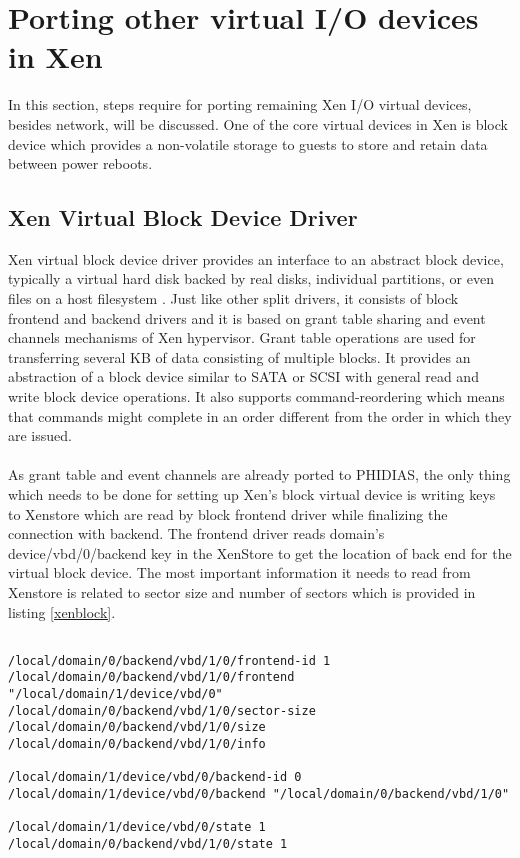 \section{Porting other virtual I/O devices in Xen \label{sec:otherio}}
In this section, steps require for porting remaining Xen I/O virtual devices, besides network, will be discussed.  One of the core virtual devices in Xen is block device which provides a non-volatile storage to guests to store and retain data between power reboots.

\subsection{Xen Virtual Block Device Driver \label{sec:block}}
Xen virtual block device driver provides an interface to an abstract block device, typically a virtual hard disk backed by real disks, individual partitions, or even files on a host filesystem \cite{xen_book}. Just like other split drivers, it consists of block frontend and backend drivers and it is based on grant table sharing and event channels mechanisms of Xen hypervisor. Grant table operations are used for transferring several KB of data consisting of multiple blocks. It provides an abstraction of a block device similar to SATA or SCSI with general read and write block device operations. It also supports command-reordering which means that commands might complete in an order different from the order in which they are issued.
\\
\\
As grant table and event channels are already ported to PHIDIAS, the only thing which needs to be done for setting up Xen's block virtual device is writing keys to Xenstore which are read by block frontend driver while finalizing the connection with backend. The frontend driver reads domain's device/vbd/0/backend key in the XenStore to get the location of back end for the virtual block device. The most important information it needs to read from Xenstore is related to sector size and number of sectors which is provided in listing \ref{xenblock}.

\begin{lstlisting}[caption= Keys in Xenstore for connecting virtual block device frontend driver with backend in Xen ,label={xenblock}]

/local/domain/0/backend/vbd/1/0/frontend-id 1
/local/domain/0/backend/vbd/1/0/frontend "/local/domain/1/device/vbd/0"
/local/domain/0/backend/vbd/1/0/sector-size
/local/domain/0/backend/vbd/1/0/size
/local/domain/0/backend/vbd/1/0/info

/local/domain/1/device/vbd/0/backend-id 0
/local/domain/1/device/vbd/0/backend "/local/domain/0/backend/vbd/1/0"

/local/domain/1/device/vbd/0/state 1
/local/domain/0/backend/vbd/1/0/state 1

\end{lstlisting}

